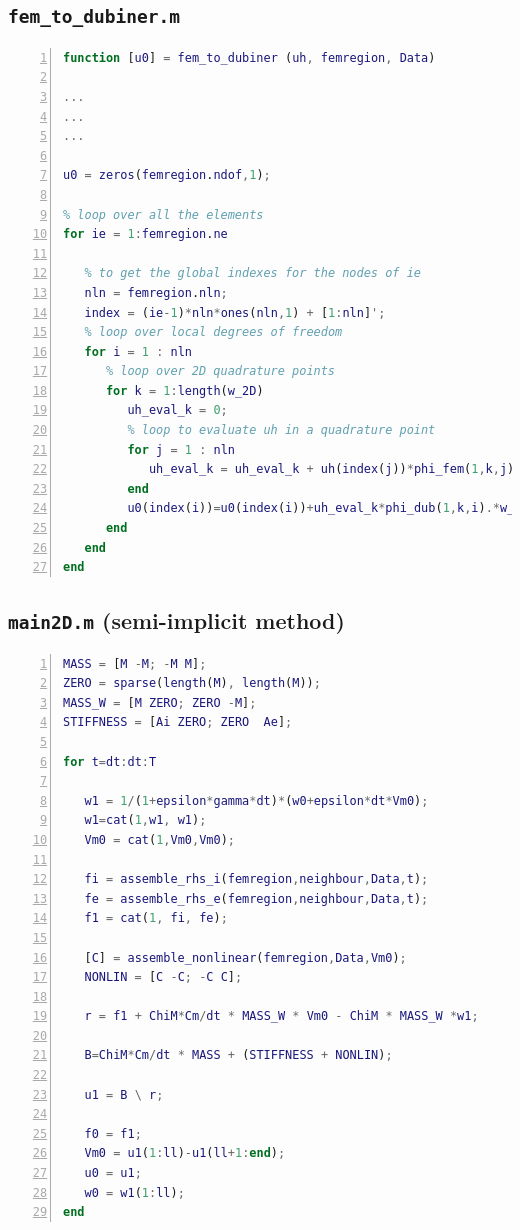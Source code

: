 \documentclass[a4paper,11pt]{article}
\begin{document}
\subsection{\texttt{fem\_to\_dubiner.m}}\label{fem_to_dub}
\begin{lstlisting}[language=Matlab,basicstyle=\small, numbers=left, numberstyle=\tiny,  name = fem_to_dubiner.m, frame=single]
function [u0] = fem_to_dubiner (uh, femregion, Data)
	
...
...
...
	
u0 = zeros(femregion.ndof,1);
	
% loop over all the elements
for ie = 1:femregion.ne
	
   % to get the global indexes for the nodes of ie 
   nln = femregion.nln;
   index = (ie-1)*nln*ones(nln,1) + [1:nln]';
   % loop over local degrees of freedom
   for i = 1 : nln
      % loop over 2D quadrature points
      for k = 1:length(w_2D) 
         uh_eval_k = 0;
         % loop to evaluate uh in a quadrature point
         for j = 1 : nln
            uh_eval_k = uh_eval_k + uh(index(j))*phi_fem(1,k,j);
         end
         u0(index(i))=u0(index(i))+uh_eval_k*phi_dub(1,k,i).*w_2D(k);
      end
   end    
end
\end{lstlisting}
\subsection{\texttt{main2D.m} (semi-implicit method)}\label{SI}
\begin{lstlisting}[language=Matlab,basicstyle=\small, numbers=left, numberstyle=\tiny,  name = main2D.m (semi-implicit), frame=single]
MASS = [M -M; -M M];
ZERO = sparse(length(M), length(M));
MASS_W = [M ZERO; ZERO -M];
STIFFNESS = [Ai ZERO; ZERO  Ae];

for t=dt:dt:T

   w1 = 1/(1+epsilon*gamma*dt)*(w0+epsilon*dt*Vm0);
   w1=cat(1,w1, w1);
   Vm0 = cat(1,Vm0,Vm0);

   fi = assemble_rhs_i(femregion,neighbour,Data,t);
   fe = assemble_rhs_e(femregion,neighbour,Data,t);
   f1 = cat(1, fi, fe);

   [C] = assemble_nonlinear(femregion,Data,Vm0);
   NONLIN = [C -C; -C C];

   r = f1 + ChiM*Cm/dt * MASS_W * Vm0 - ChiM * MASS_W *w1;

   B=ChiM*Cm/dt * MASS + (STIFFNESS + NONLIN);

   u1 = B \ r;

   f0 = f1;
   Vm0 = u1(1:ll)-u1(ll+1:end);
   u0 = u1;
   w0 = w1(1:ll);
end
\end{lstlisting}
\end{document}
